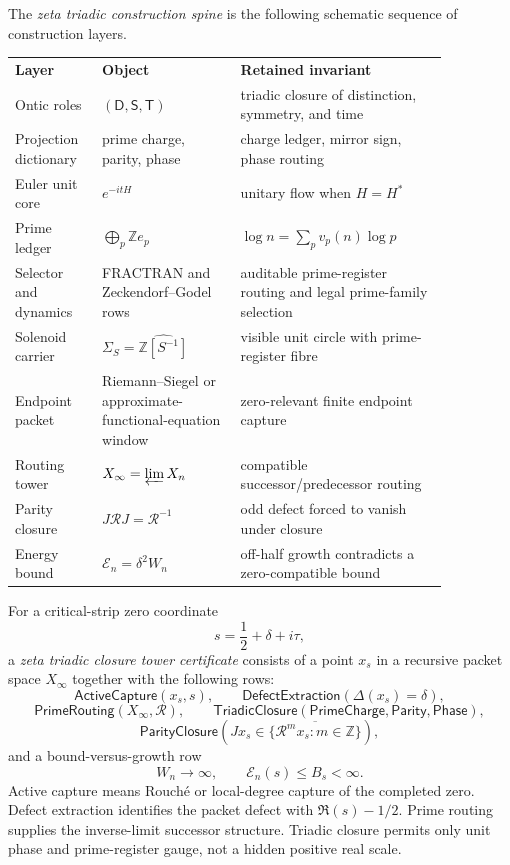 \begin{definition}
\label{def:unified-reality-zeta-triadic-construction-spine}
The \emph{zeta triadic construction spine} is the following schematic
sequence of construction layers.

\begin{center}
\begin{tabular}{p{0.16\linewidth}p{0.28\linewidth}p{0.42\linewidth}}
\textbf{Layer} & \textbf{Object} & \textbf{Retained invariant}\\
Ontic roles & $(\mathsf D,\mathsf S,\mathsf T)$ & triadic closure of distinction, symmetry, and time\\
Projection dictionary & prime charge, parity, phase & charge ledger, mirror sign, phase routing\\
Euler unit core & $e^{-itH}$ & unitary flow when $H=H^*$\\
Prime ledger & $\bigoplus_p\mathbb Z e_p$ & $\log n=\sum_p v_p(n)\log p$\\
Selector and dynamics & FRACTRAN and Zeckendorf--Godel rows & auditable prime-register routing and legal prime-family selection\\
Solenoid carrier & $\Sigma_S=\widehat{\mathbb Z[S^{-1}]}$ & visible unit circle with prime-register fibre\\
Endpoint packet & Riemann--Siegel or approximate-functional-equation window & zero-relevant finite endpoint capture\\
Routing tower & $X_\infty=\varprojlim X_n$ & compatible successor/predecessor routing\\
Parity closure & $J\mathcal R J=\mathcal R^{-1}$ & odd defect forced to vanish under closure\\
Energy bound & $\mathcal E_n=\delta^2W_n$ & off-half growth contradicts a zero-compatible bound
\end{tabular}
\end{center}
\end{definition}

\begin{definition}
\label{def:unified-reality-zeta-triadic-closure-tower-certificate}
For a critical-strip zero coordinate
$$
s=\frac12+\delta+i\tau,
$$
a \emph{zeta triadic closure tower certificate} consists of a point
$x_s$ in a recursive packet space $X_\infty$ together with the following
rows:
$$
\mathsf{ActiveCapture}(x_s,s),
\qquad
\mathsf{DefectExtraction}(\Delta(x_s)=\delta),
$$
$$
\mathsf{PrimeRouting}(X_\infty,\mathcal R),
\qquad
\mathsf{TriadicClosure}(\mathsf{PrimeCharge},\mathsf{Parity},\mathsf{Phase}),
$$
$$
\mathsf{ParityClosure}\left(
Jx_s\in\overline{\{\mathcal R^m x_s:m\in\mathbb Z\}}
\right),
$$
and a bound-versus-growth row
$$
W_n\to\infty,
\qquad
\mathcal E_n(s)\le B_s<\infty.
$$
Active capture means Rouch\'e or local-degree capture of the completed
zero.  Defect extraction identifies the packet defect with
$\Re(s)-1/2$.  Prime routing supplies the inverse-limit successor
structure.  Triadic closure permits only unit phase and prime-register
gauge, not a hidden positive real scale.
\end{definition}

